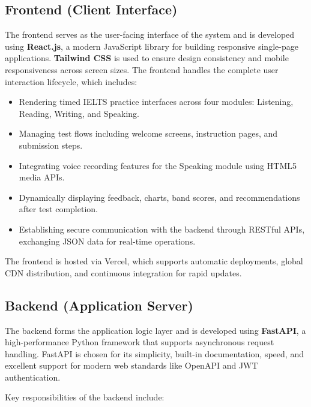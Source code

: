 \documentclass[a4paper,12pt]{article}
\begin{document}
\vspace{0.5cm}

\subsection{Frontend (Client Interface)}

The frontend serves as the user-facing interface of the system and is developed using \textbf{React.js}, a modern JavaScript library for building responsive single-page applications. \textbf{Tailwind CSS} is used to ensure design consistency and mobile responsiveness across screen sizes. The frontend handles the complete user interaction lifecycle, which includes:

\begin{itemize}
    \item Rendering timed IELTS practice interfaces across four modules: Listening, Reading, Writing, and Speaking.
    \item Managing test flows including welcome screens, instruction pages, and submission steps.
    \item Integrating voice recording features for the Speaking module using HTML5 media APIs.
    \item Dynamically displaying feedback, charts, band scores, and recommendations after test completion.
    \item Establishing secure communication with the backend through RESTful APIs, exchanging JSON data for real-time operations.
\end{itemize}

The frontend is hosted via Vercel, which supports automatic deployments, global CDN distribution, and continuous integration for rapid updates.

\vspace{0.3cm}

\subsection{Backend (Application Server)}

The backend forms the application logic layer and is developed using \textbf{FastAPI}, a high-performance Python framework that supports asynchronous request handling. FastAPI is chosen for its simplicity, built-in documentation, speed, and excellent support for modern web standards like OpenAPI and JWT authentication.

Key responsibilities of the backend include:
\end{document}
